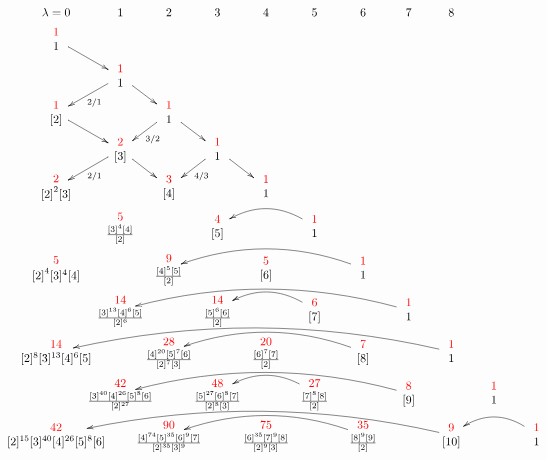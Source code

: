 %
\newcommand{\sqrr}{\square\ar[r]}
\newcommand{\goll}{\ar@/_1.3pc/[ll]} 
\newcommand{\gollll}{\ar@/_1.4pc/[llll]} 
\newcommand{\gollllll}{\ar@/_1.5pc/[llllll]} 
\newcommand{\gollllllll}{\ar@/_1.7pc/[llllllll]} 
%
%
\[ { } \hspace{-.253in}
%
\xymatrix @C=15pt @R=1pt {
  {\lambda=0  }       &  1             &  2      &  3  &  4  &  5   & 6 & 7 & 8 
  \\  %
    {\du{1}{1} }\ar[dr]
    \\
& {\du{1}{1}}\ar[dr]\ar[dl]^{2/1}
\\ 
{\du{1}{{[2]}} }\ar[dr]    &                  &
{\du{1}{1}}\ar[dr]\ar[dl]^{3/2}
\\
&{\du{2}{[3]}} \ar[dr]\ar[dl]^{2/1}               &     &
{\du{1}{1}}\ar[dr]\ar[dl]^{4/3}
\\ 
{ \du{2}{{[ 2]}^2 [3]}}  &                     &
{\du{3}{[4]} }&    &
{\du{1}{1} }
\\
    & {\du{5}{{\frac{ [3]^4 [4]}{[2]}^{}}}} &  &
    {\du{4}{[5]}} &  &
    {\du{1}{1}}\ar@/_1.3pc/[ll]
    \\ 
    {\du{5}{{[2]}^4 [3]^4 [4]}} &              &
    {\du{9}{{\frac{[4]^5[5]}{[2]}^{}}}} &    &
    {\du{5}{[6]}} & &{ \du{1}{1}}\ar@/_1.4pc/[llll]
    \\ 
    &{\du{14}{\frac{[3]^{13}[4]^6[5]}{[2]^{6}}}} &&
    {\du{14}{\frac{[5]^6[6]}{[2]^{}}}} &&
    {\du{6}{[7]}}\ar@/_1.3pc/[ll] &&
    {\du{1}{1}}\gollllll
 \\
   {\du{14}{[2]^8[3]^{13}[4]^6[5]}}  &&
   {\du{28}{\frac{[4]^{20}[5]^7[6]}{[2]^{7}[3]^{}}}} &&
   {\du{20}{\frac{[6]^7[7]}{[2]^{}}}} &&
   {\du{7}{[8]}}\gollll  &&
   {\du{1}{1}}\gollllllll \\
   & {\du{42}{\frac{[3]^{40}[4]^{26}[5]^8[6]}{[2]^{27}}}} &&
   {\du{48}{\frac{[5]^{27}[6]^8[7]}{[2]^{8}[3]^{}}}} &&
   {\du{27}{\frac{[7]^8[8]}{[2]^{}}}}\goll &&
   {\du{8}{[9]}}\gollllll &&
   {\du{1}{1}}
 \\
   {\du{42}{[2]^{15}[3]^{40}[4]^{26}[5]^{8}[6]}} &&
   {\du{90}{\frac{[4]^{74}[5]^{35}[6]^{9}[7]}{[2]^{35}[3]^{9}}}} &&
   {\du{75}{
       \frac{  [6]^{35}[7]^{9}[8]}{[2]^{9}[3]^{}}}} &&
   {\du{35}{\frac{[8]^9[9]}{[2]^{}}}}\gollll &&
   {\du{9}{[10]}}\gollllllll &&
   {\du{1}{1}}\goll
}
\]


